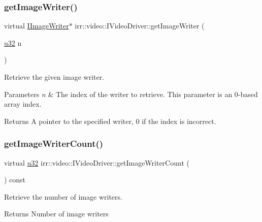 \subsubsection{\texorpdfstring{get\+Image\+Writer()}{getImageWriter()}}
{\footnotesize\ttfamily virtual \hyperlink{classirr_1_1video_1_1IImageWriter}{I\+Image\+Writer}$\ast$ irr\+::video\+::\+I\+Video\+Driver\+::get\+Image\+Writer (\begin{DoxyParamCaption}\item[{\hyperlink{namespaceirr_a0416a53257075833e7002efd0a18e804}{u32}}]{n }\end{DoxyParamCaption})\hspace{0.3cm}{\ttfamily [pure virtual]}}



Retrieve the given image writer. 


\begin{DoxyParams}{Parameters}
{\em n} & The index of the writer to retrieve. This parameter is an 0-\/based array index. \\
\hline
\end{DoxyParams}
\begin{DoxyReturn}{Returns}
A pointer to the specified writer, 0 if the index is incorrect. 
\end{DoxyReturn}
\mbox{\label{classirr_1_1video_1_1IVideoDriver_a173f33f0537a1511abdf35ed235a683a}} 
\subsubsection{\texorpdfstring{get\+Image\+Writer\+Count()}{getImageWriterCount()}}
{\footnotesize\ttfamily virtual \hyperlink{namespaceirr_a0416a53257075833e7002efd0a18e804}{u32} irr\+::video\+::\+I\+Video\+Driver\+::get\+Image\+Writer\+Count (\begin{DoxyParamCaption}{ }\end{DoxyParamCaption}) const\hspace{0.3cm}{\ttfamily [pure virtual]}}



Retrieve the number of image writers. 

\begin{DoxyReturn}{Returns}
Number of image writers 
\end{DoxyReturn}
\mbox{\label{classirr_1_1video_1_1IVideoDriver_a198bbe60fdb1b5d6d0f4921e8a26109c}} 
